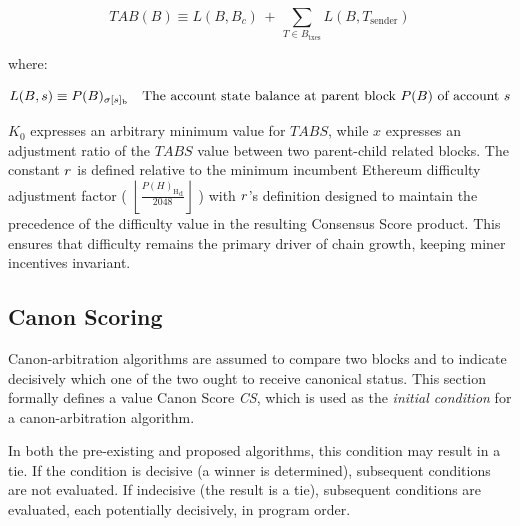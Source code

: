 \documentclass[11pt]{article}
\theoremstyle{plain}
\begin{document}
\begin{equation}
TAB(B) \equiv L(B, B_c) \, + \, \sum_{T \in B_{\mathrm{txes}}}
L(B,T_{\mathrm{sender}})
\end{equation}

where:

\begin{equation}
L(B,s) \equiv P(B)_{\sigma[s]_{\mathrm{b}}} \quad \text{The account state
balance at parent block $P(B)$ of account $s$} \\
\end{equation}

$K_0$ expresses an arbitrary minimum value for $TABS$,
while $x$ expresses an adjustment ratio of the $TABS$ value between two parent-child related blocks.
The constant $r$ is defined relative to
the minimum incumbent Ethereum difficulty adjustment factor (
    $\left\lfloor\frac{{P(H)_{\mathrm{H}}}_{\mathrm{d}}}{2048}\right\rfloor$
)
with $r$'s definition designed
to maintain the precedence of the difficulty value in the resulting Consensus Score product.
This ensures that difficulty remains the primary driver of chain growth,
keeping miner incentives invariant.


\subsection{\small{Canon Scoring}}

Canon-arbitration algorithms are assumed to compare two blocks and to
indicate decisively which one of the two ought to receive canonical status.
This section formally defines a value Canon Score \textit{CS}, which is used as
the \textit{initial condition} for a canon-arbitration algorithm.

In both the pre-existing and proposed algorithms, this condition may result in a tie.
If the condition is decisive (a winner is determined),
subsequent conditions are not evaluated.
If indecisive (the result is a tie), subsequent conditions are evaluated,
each potentially decisively, in program order.
\end{document}
